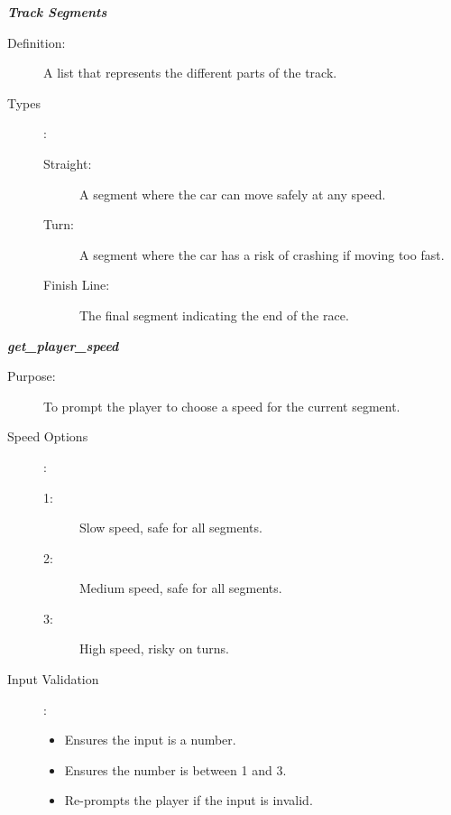 \documentclass[12pt]{article}
\begin{document}
\textit{\textbf{Track Segments}}
\begin{description}
    \item[Definition:] A list that represents the different parts of the track.
    \item[Types]:
    \begin{description}
        \item[Straight:] A segment where the car can move safely at any speed.
        \item[Turn:] A segment where the car has a risk of crashing if moving too fast.
        \item[Finish Line:] The final segment indicating the end of the race.
    \end{description}
\end{description}

\textit{\textbf{get\_player\_speed}}
\begin{description}
    \item[Purpose:] To prompt the player to choose a speed for the current segment.
    \item[Speed Options]:
    \begin{description}
        \item[1:] Slow speed, safe for all segments.
        \item[2:] Medium speed, safe for all segments.
        \item[3:] High speed, risky on turns.
    \end{description}
    \item[Input Validation]:
    \begin{itemize}
        \item Ensures the input is a number.
        \item Ensures the number is between 1 and 3.
        \item Re-prompts the player if the input is invalid.
    \end{itemize}
\end{description}
\end{document}
